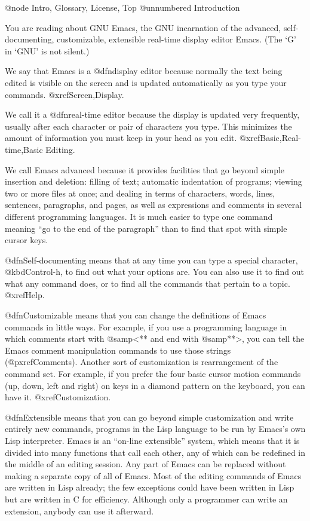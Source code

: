 @node Intro, Glossary, License, Top
@unnumbered Introduction

  You are reading about GNU Emacs, the GNU incarnation of the advanced,
self-documenting, customizable, extensible real-time display editor Emacs.
(The `G' in `GNU' is not silent.)

  We say that Emacs is a @dfn{display} editor because normally the text
being edited is visible on the screen and is updated automatically as you
type your commands.  @xref{Screen,Display}.

  We call it a @dfn{real-time} editor because the display is updated very
frequently, usually after each character or pair of characters you
type.  This minimizes the amount of information you must keep in your
head as you edit.  @xref{Basic,Real-time,Basic Editing}.

  We call Emacs advanced because it provides facilities that go beyond
simple insertion and deletion: filling of text; automatic indentation of
programs; viewing two or more files at once; and dealing in terms of
characters, words, lines, sentences, paragraphs, and pages, as well as
expressions and comments in several different programming languages.  It is
much easier to type one command meaning ``go to the end of the paragraph''
than to find that spot with simple cursor keys.

  @dfn{Self-documenting} means that at any time you can type a special
character, @kbd{Control-h}, to find out what your options are.  You can
also use it to find out what any command does, or to find all the commands
that pertain to a topic.  @xref{Help}.

  @dfn{Customizable} means that you can change the definitions of Emacs
commands in little ways.  For example, if you use a programming language in
which comments start with @samp{<**} and end with @samp{**>}, you can tell
the Emacs comment manipulation commands to use those strings
(@pxref{Comments}).  Another sort of customization is rearrangement of the
command set.  For example, if you prefer the four basic cursor motion
commands (up, down, left and right) on keys in a diamond pattern on the
keyboard, you can have it.  @xref{Customization}.

  @dfn{Extensible} means that you can go beyond simple customization and
write entirely new commands, programs in the Lisp language to be run by
Emacs's own Lisp interpreter.  Emacs is an ``on-line extensible'' system,
which means that it is divided into many functions that call each other,
any of which can be redefined in the middle of an editing session.  Any
part of Emacs can be replaced without making a separate copy of all of
Emacs.  Most of the editing commands of Emacs are written in Lisp already;
the few exceptions could have been written in Lisp but are written in C for
efficiency.  Although only a programmer can write an extension, anybody can
use it afterward.

